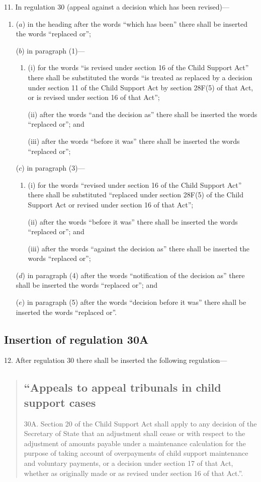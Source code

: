 \documentclass[12pt,a4paper]{article}
\begin{document}
11.  In regulation 30 (appeal against a decision which has been revised)—
\begin{enumerate}\item[]
($a$) in the heading after the words “which has been” there shall be inserted the words “replaced or”;

($b$) in paragraph (1)—
\begin{enumerate}\item[]
(i) for the words “is revised under section 16 of the Child Support Act” there shall be substituted the words “is treated as replaced by a decision under section 11 of the Child Support Act by section 28F(5) of that Act, or is revised under section 16 of that Act”;

(ii) after the words “and the decision as” there shall be inserted the words “replaced or”; and

(iii) after the words “before it was” there shall be inserted the words “replaced or”;
\end{enumerate}

($c$) in paragraph (3)—
\begin{enumerate}\item[]
(i) for the words “revised under section 16 of the Child Support Act” there shall be substituted “replaced under section 28F(5) of the Child Support Act or revised under section 16 of that Act”;

(ii) after the words “before it was” there shall be inserted the words “replaced or”; and

(iii) after the words “against the decision as” there shall be inserted the words “replaced or”;
\end{enumerate}

($d$) in paragraph (4) after the words “notification of the decision as” there shall be inserted the words “replaced or”; and

($e$) in paragraph (5) after the words “decision before it was” there shall be inserted the words “replaced or”.
\end{enumerate}

\subsection[12. Insertion of regulation 30A]{Insertion of regulation 30A}

12.  After regulation 30 there shall be inserted the following regulation—
\begin{quotation}
\subsection*{\sloppy “Appeals to appeal tribunals in child support cases}

30A.  Section 20 of the Child Support Act shall apply to any decision of the Secretary of State that an adjustment shall cease or with respect to the adjustment of amounts payable under a maintenance calculation for the purpose of taking account of overpayments of child support maintenance and voluntary payments, or a decision under section 17 of that Act, whether as originally made or as revised under section 16 of that Act.”.
\end{quotation}
\end{document}
